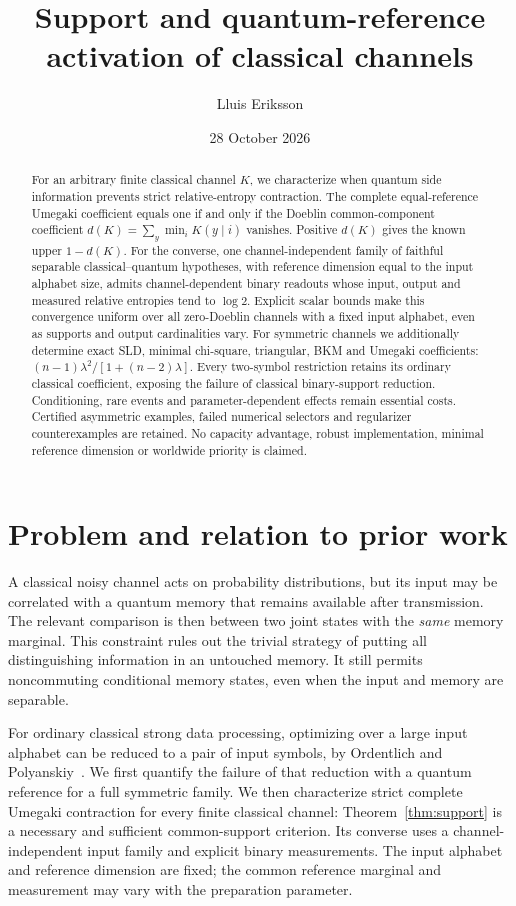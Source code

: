 \documentclass[11pt]{article}
\title{Support and quantum-reference activation of classical channels}
\author{Lluis Eriksson}
\date{28 October 2026}
\theoremstyle{remark}\newtheorem{remark}[theorem]{Remark}
\begin{document}
\maketitle
\begin{abstract}
For an arbitrary finite classical channel $K$, we characterize when quantum side information prevents strict relative-entropy contraction. The complete equal-reference Umegaki coefficient equals one if and only if the Doeblin common-component coefficient $d(K)=\sum_y\min_iK(y\mid i)$ vanishes. Positive $d(K)$ gives the known upper $1-d(K)$. For the converse, one channel-independent family of faithful separable classical--quantum hypotheses, with reference dimension equal to the input alphabet size, admits channel-dependent binary readouts whose input, output and measured relative entropies tend to $\log2$. Explicit scalar bounds make this convergence uniform over all zero-Doeblin channels with a fixed input alphabet, even as supports and output cardinalities vary. For symmetric channels we additionally determine exact SLD, minimal chi-square, triangular, BKM and Umegaki coefficients: $(n-1)\lambda^2/[1+(n-2)\lambda]$. Every two-symbol restriction retains its ordinary classical coefficient, exposing the failure of classical binary-support reduction. Conditioning, rare events and parameter-dependent effects remain essential costs. Certified asymmetric examples, failed numerical selectors and regularizer counterexamples are retained. No capacity advantage, robust implementation, minimal reference dimension or worldwide priority is claimed.
\end{abstract}

\section{Problem and relation to prior work}
A classical noisy channel acts on probability distributions, but its input may be correlated with a quantum memory that remains available after transmission. The relevant comparison is then between two joint states with the \emph{same} memory marginal. This constraint rules out the trivial strategy of putting all distinguishing information in an untouched memory. It still permits noncommuting conditional memory states, even when the input and memory are separable.

For ordinary classical strong data processing, optimizing over a large input alphabet can be reduced to a pair of input symbols, by Ordentlich and Polyanskiy~\cite{OP}. We first quantify the failure of that reduction with a quantum reference for a full symmetric family. We then characterize strict complete Umegaki contraction for every finite classical channel: Theorem~\ref{thm:support} is a necessary and sufficient common-support criterion. Its converse uses a channel-independent input family and explicit binary measurements. The input alphabet and reference dimension are fixed; the common reference marginal and measurement may vary with the preparation parameter.
\end{document}

